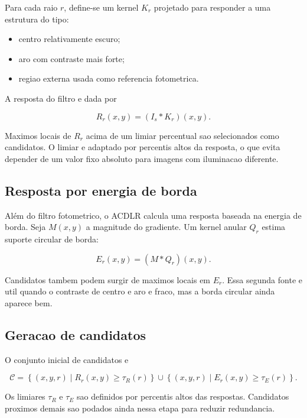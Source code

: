 \documentclass[12pt,a4paper]{article}
\begin{document}
Para cada raio $r$, define-se um kernel $K_r$ projetado para responder a uma estrutura do tipo:

\begin{itemize}
    \item centro relativamente escuro;
    \item aro com contraste mais forte;
    \item regiao externa usada como referencia fotometrica.
\end{itemize}

A resposta do filtro e dada por

\begin{equation}
R_r(x,y) = (I_s * K_r)(x,y).
\end{equation}

Maximos locais de $R_r$ acima de um limiar percentual sao selecionados como candidatos. O limiar e adaptado por percentis altos da resposta, o que evita depender de um valor fixo absoluto para imagens com iluminacao diferente.

\subsection{Resposta por energia de borda}

Além do filtro fotometrico, o ACDLR calcula uma resposta baseada na energia de borda. Seja $M(x,y)$ a magnitude do gradiente. Um kernel anular $Q_r$ estima suporte circular de borda:

\begin{equation}
E_r(x,y) = (M * Q_r)(x,y).
\end{equation}

Candidatos tambem podem surgir de maximos locais em $E_r$. Essa segunda fonte e util quando o contraste de centro e aro e fraco, mas a borda circular ainda aparece bem.

\subsection{Geracao de candidatos}

O conjunto inicial de candidatos e

\begin{equation}
\mathcal{C} =
\left\{(x,y,r) \mid R_r(x,y) \geq \tau_R(r) \right\}
\cup
\left\{(x,y,r) \mid E_r(x,y) \geq \tau_E(r) \right\}.
\end{equation}

Os limiares $\tau_R$ e $\tau_E$ sao definidos por percentis altos das respostas. Candidatos proximos demais sao podados ainda nessa etapa para reduzir redundancia.
\end{document}

